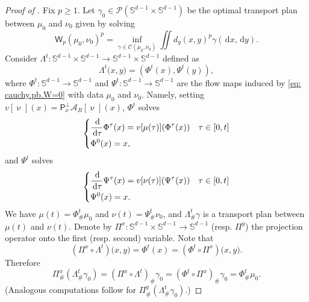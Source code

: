 \documentclass[a4paper,11pt]{article}
\theoremstyle{plain}
\newcommand{\proj}{\bm{\mathsf{P}}^\perp}
\newcommand{\diff}{\, \mathrm{d}}
\renewcommand{\S}{\mathbb{S}^{d-1}}
\newcommand{\bB}{\bm{\mathit{B}}}
\renewcommand{\geq}{\geqslant}
\numberwithin{equation}{section}
\begin{document}
\begin{proof}[Proof of ]
     Fix $p\geq 1$. Let $\gamma_0\in \mathscr{P}(\S\times \S)$ be the optimal transport plan between $\mu_0$ and $\nu_0$ given by solving
    \begin{equation*}
    \mathsf{W}_p(\mu_0,\nu_0)^p=\inf_{\gamma\in \mathcal{C}(\mu_0,\nu_0)}\iint d_g(x,y)^p\gamma(\diff x, \diff y).
    \end{equation*}
    Consider $\Lambda^t:\S\times \S\to \S\times \S$ defined as
    \begin{equation*}
        \Lambda^t\big(x,y\big)=\left(\Phi^t(x),\Psi^t(y)\right),
    \end{equation*}
    where $\Phi^t:\S\to \S$ and $\Psi^t:\S\to \S$ are the flow maps induced by \eqref{eq: cauchy.pb.W=0} with data $\mu_0$ and $\nu_0$. Namely, setting $v[\upnu](x) = \proj_x \mathscr{A}_{\bB}[\upnu](x)$, $\Phi^t$ solves
    \begin{equation*}
        \begin{dcases}
            \displaystyle\frac{\diff}{\diff \tau}\Phi^\tau(x)= v[\mu(\tau)](\Phi^\tau(x)) &\tau\in[0,t]\\
            \Phi^0(x)=x,
        \end{dcases}
    \end{equation*}
    and $\Psi^t$ solves
    \begin{equation*}
        \begin{dcases}
            \frac{\diff}{\diff \tau}\Psi^\tau(x)= v[\nu(\tau)](\Psi^\tau(x)) & \tau\in[0,t]\\
            \Psi^0(x)=x.
        \end{dcases}
    \end{equation*}
    We have $\mu(t)=\Phi^t_\#\mu_0$ and $\nu(t)=\Psi^t_\#\nu_0$, and $\Lambda_\#^t\gamma$ is a transport plan between $\mu(t)$ and $\nu(t)$.
    Denote by $\Pi^x:\S\times \S\to \S$ (resp. $\Pi^y$) the projection operator onto the first (resp. second) variable. Note that
    \begin{equation*}       \left(\Pi^x\circ\Lambda^t\right)\big(x,y\big)=\Phi^t(x)=\left( \Phi^t\circ \Pi^x \right)\big(x,y\big).
    \end{equation*}
    Therefore
    \begin{equation*}
\Pi^x_\#\left(\Lambda^t_\#\gamma_0\right)=\left(\Pi^x\circ\Lambda^t\right)_\#\gamma_0=\left(\Phi^t\circ \Pi^x\right)_\#\gamma_0=\Phi^t_\#\mu_0.
    \end{equation*}
    (Analogous computations follow for $\Pi^y_\#(\Lambda^t_\#\gamma_0)$.)

\end{proof}
\end{document}
